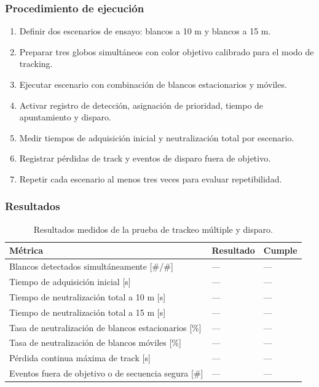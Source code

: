 \subsubsection{Procedimiento de ejecución}

\begin{enumerate}
    \item Definir dos escenarios de ensayo: blancos a 10 m y blancos a 15 m.
    \item Preparar tres globos simultáneos con color objetivo calibrado para el modo de tracking.
    \item Ejecutar escenario con combinación de blancos estacionarios y móviles.
    \item Activar registro de detección, asignación de prioridad, tiempo de apuntamiento y disparo.
    \item Medir tiempos de adquisición inicial y neutralización total por escenario.
    \item Registrar pérdidas de track y eventos de disparo fuera de objetivo.
    \item Repetir cada escenario al menos tres veces para evaluar repetibilidad.
\end{enumerate}

\subsubsection{Resultados}

\begin{table}[H]
\centering
\small
\begin{tabular}{p{8.8cm} p{2.2cm} p{2.8cm}}
\toprule
\textbf{Métrica} & \textbf{Resultado} & \textbf{Cumple} \\
\midrule
Blancos detectados simultáneamente [\#/\#] & --- & --- \\
Tiempo de adquisición inicial [s] & --- & --- \\
Tiempo de neutralización total a 10 m [s] & --- & --- \\
Tiempo de neutralización total a 15 m [s] & --- & --- \\
Tasa de neutralización de blancos estacionarios [\%] & --- & --- \\
Tasa de neutralización de blancos móviles [\%] & --- & --- \\
Pérdida continua máxima de track [s] & --- & --- \\
Eventos fuera de objetivo o de secuencia segura [\#] & --- & --- \\
\bottomrule
\end{tabular}
\caption{Resultados medidos de la prueba de trackeo múltiple y disparo.}
\label{tab:resultados_prueba_trackeo_multiple}
\end{table}
